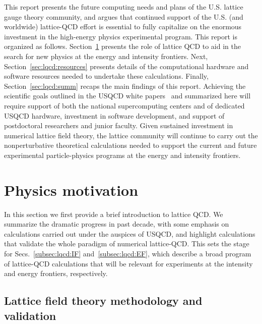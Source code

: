 This report presents the future computing needs and plans of the U.S. lattice gauge theory community, and argues that continued support of the U.S. (and worldwide) lattice-QCD effort is essential to fully capitalize on the enormous investment in the high-energy physics experimental program.  This report is organized as follows.  Section~\ref{sec:lqcd:physics} presents the role of lattice QCD to aid in the search for new physics at the energy and intensity frontiers.  Next, Section~\ref{sec:lqcd:resources} presents details of the computational hardware and software resources needed to undertake
these calculations.   Finally, Section~\ref{sec:lqcd:summ} recaps the main findings of this report.   Achieving the scientific goals outlined in the USQCD white papers~\cite{USQCD_EF_whitepaper13,USQCD_IF_whitepaper13} and summarized here will require support of both the national supercomputing centers and of dedicated USQCD hardware, investment in software development, and support of postdoctoral researchers and junior faculty.  Given sustained investment in numerical lattice field theory, the lattice community will continue to carry out the nonperturbative theoretical calculations needed to support the current and future experimental particle-physics programs at the energy and intensity frontiers.

\section{Physics motivation}
\label{sec:lqcd:physics}

In this section we first provide a brief introduction to lattice QCD.  We summarize the dramatic progress in past decade, with some emphasis on calculations carried out under the auspices of USQCD, and highlight calculations that validate the whole paradigm of numerical lattice-QCD.  This sets the stage for Secs.~\ref{subsec:lqcd:IF} and~\ref{subsec:lqcd:EF}, which describe a broad program of lattice-QCD calculations that will be relevant for experiments at the intensity and energy frontiers, respectively.  

\subsection{Lattice field theory methodology and validation}
\label{subsec:lqcd:validation}

